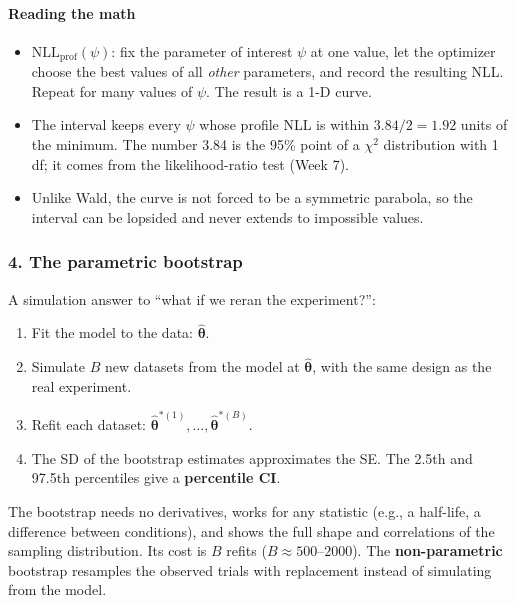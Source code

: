 \paragraph{Reading the math}

\begin{itemize}
\tightlist
\item
  \(\mathrm{NLL}_{\text{prof}}(\psi)\): fix the parameter of interest
  \(\psi\) at one value, let the optimizer choose the best values of all
  \emph{other} parameters, and record the resulting NLL. Repeat for many
  values of \(\psi\). The result is a 1-D curve.
\item
  The interval keeps every \(\psi\) whose profile NLL is within
  \(3.84/2 = 1.92\) units of the minimum. The number 3.84 is the 95\%
  point of a \(\chi^2\) distribution with 1 df; it comes from the
  likelihood-ratio test (Week 7).
\item
  Unlike Wald, the curve is not forced to be a symmetric parabola, so
  the interval can be lopsided and never extends to impossible values.
\end{itemize}

\subsubsection{4. The parametric bootstrap}

A simulation answer to ``what if we reran the experiment?'':

\begin{enumerate}
\def\labelenumi{\arabic{enumi}.}
\tightlist
\item
  Fit the model to the data: \(\hat{\boldsymbol\theta}\).
\item
  Simulate \(B\) new datasets from the model at
  \(\hat{\boldsymbol\theta}\), with the same design as the real
  experiment.
\item
  Refit each dataset:
  \(\hat{\boldsymbol\theta}^{*(1)}, \dots, \hat{\boldsymbol\theta}^{*(B)}\).
\item
  The SD of the bootstrap estimates approximates the SE. The 2.5th and
  97.5th percentiles give a \textbf{percentile CI}.
\end{enumerate}

The bootstrap needs no derivatives, works for any statistic (e.g., a
half-life, a difference between conditions), and shows the full shape
and correlations of the sampling distribution. Its cost is \(B\) refits
(\(B \approx 500\)--\(2000\)). The \textbf{non-parametric} bootstrap
resamples the observed trials with replacement instead of simulating
from the model.

